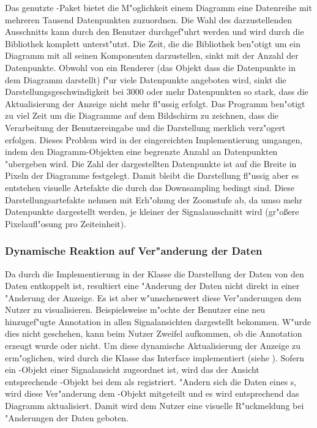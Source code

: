 Das genutzte \jfcNS-Paket bietet die M"oglichkeit einem Diagramm eine Datenreihe mit mehreren Tausend Datenpunkten zuzuordnen.
Die Wahl des darzustellenden Ausschnitts kann durch den Benutzer durchgef"uhrt werden und wird durch die Bibliothek komplett unterst"utzt.
Die Zeit, die die Bibliothek ben"otigt um ein Diagramm mit all seinen Komponenten darzustellen, sinkt mit der Anzahl der Datenpunkte.
Obwohl von \jfc ein Renderer (das Objekt dass die Datenpunkte in dem Diagramm darstellt) f"ur viele Datenpunkte angeboten wird, sinkt die Darstellungsgeschwindigkeit bei \unit{3000} oder mehr Datenpunkten so stark, dass die Aktualisierung der Anzeige nicht mehr fl"ussig erfolgt.
Das Programm ben"otigt zu viel Zeit um die Diagramme auf dem Bildschirm zu zeichnen, dass die Verarbeitung der Benutzereingabe und die Darstellung merklich verz"ogert erfolgen.
Dieses Problem wird in der eingereichten Implementierung umgangen, indem den Diagramm-Objekten eine begrenzte Anzahl an Datenpunkten "ubergeben wird.
Die Zahl der dargestellten Datenpunkte ist auf die Breite in Pixeln der Diagramme festgelegt.
Damit bleibt die Darstellung fl"ussig aber es entstehen visuelle Artefakte die durch das Downsampling bedingt sind.
Diese Darstellungsartefakte nehmen mit Erh"ohung der Zoomstufe ab, da umso mehr Datenpunkte dargestellt werden, je kleiner der Signalausschnitt wird (gr"o{\ss}ere Pixelaufl"osung pro Zeiteinheit).


\subsubsection{Dynamische Reaktion auf Ver"anderung der Daten}
\label{sec:dynamic_reaction}

Da durch die Implementierung in der Klasse  die Darstellung der Daten von den Daten entkoppelt ist, resultiert eine "Anderung der Daten nicht direkt in einer "Anderung der Anzeige.
Es ist aber w"unschenswert diese Ver"anderungen dem Nutzer zu visualisieren.
Beispielsweise m"ochte der Benutzer eine neu hinzugef"ugte Annotation in allen Signalansichten dargestellt bekommen.
W"urde dies nicht geschehen, kann beim Nutzer Zweifel aufkommen, ob die Annotation erzeugt wurde oder nicht.
Um diese dynamische Aktualisierung der Anzeige zu erm"oglichen, wird durch die Klasse  das Interface  implementiert (siehe ).
Sofern ein -Objekt einer Signalansicht zugeordnet ist, wird das der Ansicht entsprechende -Objekt bei dem  als  registriert.
"Andern sich die Daten eines s, wird diese Ver"anderung dem -Objekt mitgeteilt und es wird entsprechend das Diagramm aktualisiert.
Damit wird dem Nutzer eine visuelle R"uckmeldung bei "Anderungen der Daten geboten.

